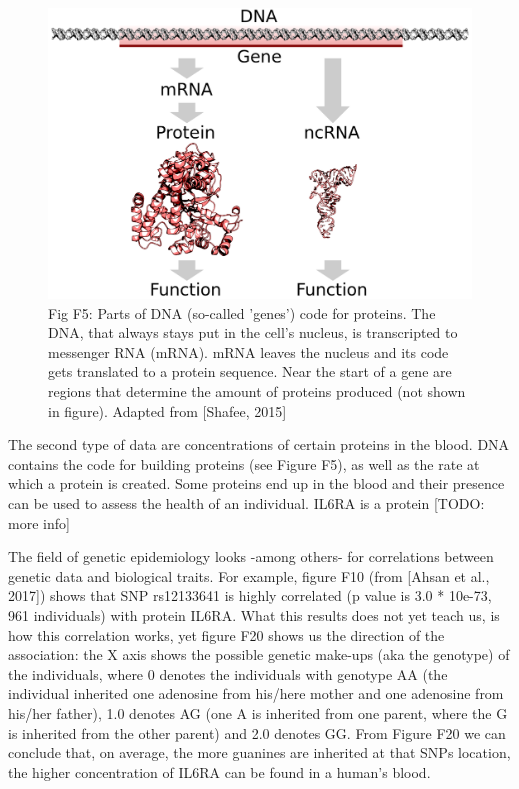 \begin{figure}[!htbp]
  \centering
  \includegraphics[width=\linewidth]{DNA_to_protein_or_ncRNA.png}
  \caption{
    Fig F5: Parts of DNA (so-called 'genes') code for proteins. 
    The DNA, that always stays put in the cell's nucleus, 
    is transcripted to messenger RNA (mRNA).
    mRNA leaves the nucleus and its code gets translated to 
    a protein sequence.
    Near the start of a gene are regions that determine the amount
    of proteins produced (not shown in figure).
    Adapted from [Shafee, 2015]
  }
  \label{fig:dna_to_protein}
\end{figure}

The second type of data are concentrations of certain proteins in the 
blood. DNA contains the code for building proteins (see Figure F5), 
as well as the rate
at which a protein is created. Some proteins end up in the blood and
their presence can be used to assess the health of an individual.
IL6RA is a protein [TODO: more info]

The field of genetic epidemiology looks -among others- for
correlations between genetic data and biological traits.
For example, figure F10 (from [Ahsan et al., 2017]) shows that
SNP rs12133641 is highly correlated (p value is 3.0 * 10e-73, 
961 individuals) with protein IL6RA. What this results does
not yet teach us, is how this correlation works, yet
figure F20 shows us the direction of the association:
the X axis shows the possible genetic make-ups (aka the genotype) of the individuals,
where 0 denotes the individuals with genotype
AA (the individual inherited one adenosine 
from his/here mother and one adenosine from his/her father), 
1.0 denotes AG (one A is inherited from one parent, 
where the G is inherited from the other parent) and 2.0 denotes GG.
From Figure F20 we can conclude that, on average,
the more guanines are inherited at that SNPs location,
the higher concentration of IL6RA can be found in a human's blood.

